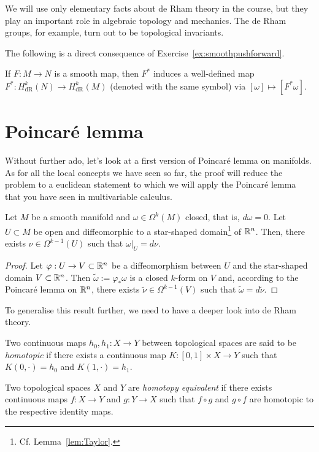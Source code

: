 We will use only elementary facts about de Rham theory in the course, but they play an important role in algebraic topology and mechanics.
The de Rham groups, for example, turn out to be topological invariants.

The following is a direct consequence of Exercise~\ref{ex:smoothpushforward}.

\begin{corollary}
	If $F:M\to N$ is a smooth map, then $F^*$ induces a well-defined map $F^*:H_{\mathrm{dR}}^k(N) \to H_{\mathrm{dR}}^k(M)$ (denoted with the same symbol) via $[\omega]\mapsto[F^*\omega]$.
\end{corollary}

\section{Poincar\'e lemma}
Without further ado, let's look at a first version of Poincar\'e lemma on manifolds.
As for all the local concepts we have seen so far, the proof will reduce the problem to a euclidean statement to which we will apply the Poincar\'e lemma that you have seen in multivariable calculus.

\begin{theorem}
	Let $M$ be a smooth manifold and $\omega\in\Omega^k(M)$ closed, that is, $d\omega = 0$.
	Let $U\subset M$ be open and diffeomorphic to a star-shaped domain\footnote{Cf. Lemma~\ref{lem:Taylor}.} of $\mathbb{R}^n$.
	Then, there exists $\nu\in\Omega^{k-1}(U)$ such that $\omega|_U = d\nu$.
\end{theorem}
\begin{proof}
	Let $\varphi: U \to V\subset\mathbb{R}^n$ be a diffeomorphism between $U$ and the star-shaped domain $V\subset\mathbb{R}^n$.
	Then $\widetilde\omega := \varphi_*\omega$ is a closed $k$-form on $V$ and, according to the Poincar\'e lemma on $\mathbb{R}^n$, there exists $\widetilde \nu \in \Omega^{k-1}(V)$ such that $\widetilde\omega = d\widetilde\nu$.
\end{proof}

To generalise this result further, we need to have a deeper look into de Rham theory.

\begin{definition}
	Two continuous maps $h_0, h_1:X\to Y$ between topological spaces are said to be \emph{homotopic} if there exists a continuous map $K: [0,1]\times X\to Y$ such that $K(0, \cdot) = h_0$ and $K(1,\cdot) = h_1$.

	Two topological spaces $X$ and $Y$ are \emph{homotopy equivalent} if there exists continuous maps $f:X\to Y$ and $g:Y\to X$ such that $f\circ g$ and $g\circ f$ are homotopic to the respective identity maps.
\end{definition}


